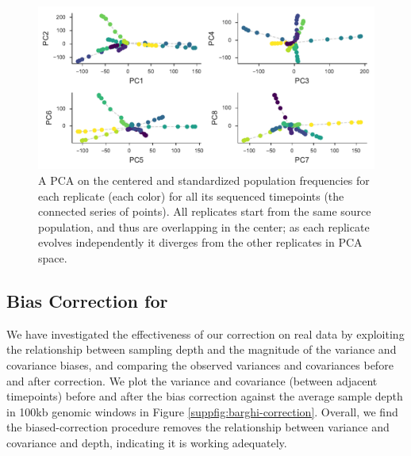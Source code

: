 \documentclass[11pt]{article}
\begin{document}
\begin{figure}[!ht]
  \centering

  \includegraphics[]{figures/barghi-panel-pca.pdf}

  \caption{A PCA on the centered and standardized population frequencies for
  each replicate (each color) for all its sequenced timepoints (the connected
  series of points). All replicates start from the same source population, and
  thus are overlapping in the center; as each replicate evolves independently it
  diverges from the other replicates in PCA space.}

  \label{suppfig:barghi-pca}
\end{figure}

\subsection{Bias Correction for \textcite{Barghi2019-qy}}

We have investigated the effectiveness of our correction on real data by
exploiting the relationship between sampling depth and the magnitude of the
variance and covariance biases, and comparing the observed variances and
covariances before and after correction. We plot the variance and covariance
(between adjacent timepoints) before and after the bias correction against the
average sample depth in 100kb genomic windows in Figure
\ref{suppfig:barghi-correction}. Overall, we find the biased-correction
procedure removes the relationship between variance and covariance and depth, indicating it is working adequately.
\end{document}
